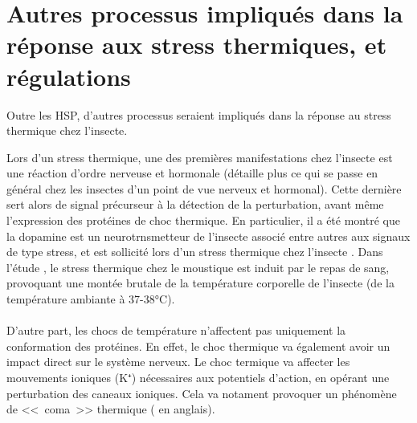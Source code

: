

	\section{Autres processus impliqués dans la réponse aux stress thermiques, et régulations} %
	\label{sec:rep_misc}
%		

Outre les HSP, d'autres processus seraient impliqués dans la réponse au stress thermique chez l'insecte.

Lors d'un stress thermique, une des premières manifestations chez l'insecte est une réaction d'ordre nerveuse et hormonale (détaille plus ce qui se passe en général chez les insectes d’un point de vue nerveux et hormonal).
Cette dernière sert alors de signal précurseur à la détection de la perturbation, avant même l'expression des protéines de choc thermique.
En particulier, il a été montré que la dopamine est un neurotrnsmetteur de l'insecte associé entre autres aux signaux de type stress, et est sollicité lors d'un stress thermique chez l'insecte \cite{andersen2006}.
Dans l'étude \cite{andersen2006}, le stress thermique chez le moustique est induit par le repas de sang, provoquant une montée brutale de la température corporelle de l'insecte (de la température ambiante à 37-38°C).


\paragraph{}

D'autre part, les chocs de température n'affectent pas uniquement la conformation des protéines.
En effet, le choc thermique va également avoir un impact direct sur le système nerveux.
Le choc termique va affecter les mouvements ioniques (K⁺) nécessaires aux potentiels d'action, en opérant une perturbation des caneaux ioniques.
Cela va notament provoquer un phénomène de <<~coma~>> thermique ( en anglais)\cite{armstrong2012}.



